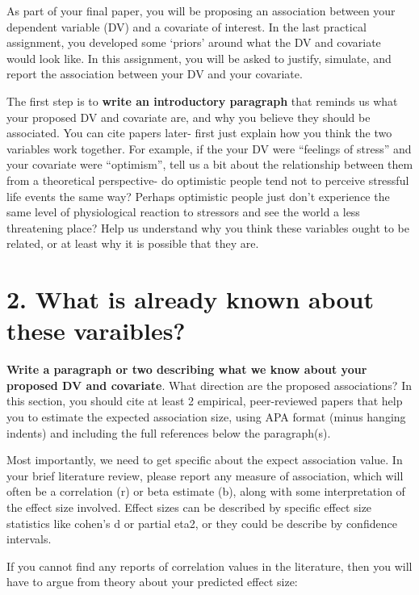 \documentclass[
]{book}
\begin{document}
As part of your final paper, you will be proposing an association between your dependent variable (DV) and a covariate of interest. In the last practical assignment, you developed some `priors' around what the DV and covariate would look like. In this assignment, you will be asked to justify, simulate, and report the association between your DV and your covariate.

The first step is to \textbf{write an introductory paragraph} that reminds us what your proposed DV and covariate are, and why you believe they should be associated. You can cite papers later- first just explain how you think the two variables work together. For example, if the your DV were ``feelings of stress'' and your covariate were ``optimism'', tell us a bit about the relationship between them from a theoretical perspective- do optimistic people tend not to perceive stressful life events the same way? Perhaps optimistic people just don't experience the same level of physiological reaction to stressors and see the world a less threatening place? Help us understand why you think these variables ought to be related, or at least why it is possible that they are.

\section*{2. What is already known about these varaibles?}\label{what-is-already-known-about-these-varaibles}

\textbf{Write a paragraph or two describing what we know about your proposed DV and covariate}. What direction are the proposed associations? In this section, you should cite at least 2 empirical, peer-reviewed papers that help you to estimate the expected association size, using APA format (minus hanging indents) and including the full references below the paragraph(s).

Most importantly, we need to get specific about the expect association value. In your brief literature review, please report any measure of association, which will often be a correlation (r) or beta estimate (b), along with some interpretation of the effect size involved. Effect sizes can be described by specific effect size statistics like cohen's d or partial eta2, or they could be describe by confidence intervals.

If you cannot find any reports of correlation values in the literature, then you will have to argue from theory about your predicted effect size:
\end{document}
